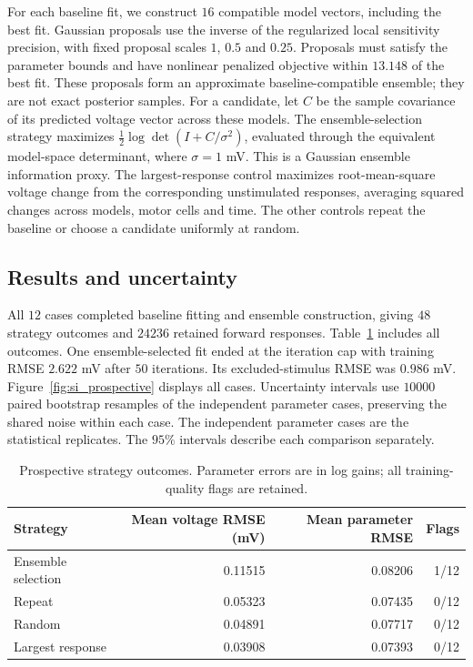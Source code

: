 \documentclass[11pt,letterpaper]{article}
\begin{document}
For each baseline fit, we construct $16$ compatible model vectors, including the best fit. Gaussian proposals use the inverse of the regularized local sensitivity precision, with fixed proposal scales $1$, $0.5$ and $0.25$. Proposals must satisfy the parameter bounds and have nonlinear penalized objective within $13.148$ of the best fit. These proposals form an approximate baseline-compatible ensemble; they are not exact posterior samples. For a candidate, let $C$ be the sample covariance of its predicted voltage vector across these models. The ensemble-selection strategy maximizes $\frac12\log\det(I+C/\sigma^2)$, evaluated through the equivalent model-space determinant, where $\sigma=1$ mV. This is a Gaussian ensemble information proxy. The largest-response control maximizes root-mean-square voltage change from the corresponding unstimulated responses, averaging squared changes across models, motor cells and time. The other controls repeat the baseline or choose a candidate uniformly at random.

\subsection{Results and uncertainty}
All $12$ cases completed baseline fitting and ensemble construction, giving $48$ strategy outcomes and $24236$ retained forward responses. Table~\ref{tab:prospective} includes all outcomes. One ensemble-selected fit ended at the iteration cap with training RMSE $2.622$ mV after $50$ iterations. Its excluded-stimulus RMSE was $0.986$ mV. Figure~\ref{fig:si_prospective} displays all cases. Uncertainty intervals use $10000$ paired bootstrap resamples of the independent parameter cases, preserving the shared noise within each case. The independent parameter cases are the statistical replicates. The $95\%$ intervals describe each comparison separately.

\begin{table}[H]\centering
\caption{Prospective strategy outcomes. Parameter errors are in log gains; all training-quality flags are retained.}\label{tab:prospective}
\begin{tabular}{lrrr}\toprule
Strategy & Mean voltage RMSE (mV) & Mean parameter RMSE & Flags \\\midrule
Ensemble selection & 0.11515 & 0.08206 & 1/12 \\
Repeat & 0.05323 & 0.07435 & 0/12 \\
Random & 0.04891 & 0.07717 & 0/12 \\
Largest response & 0.03908 & 0.07393 & 0/12 \\
\bottomrule\end{tabular}\end{table}
\end{document}
